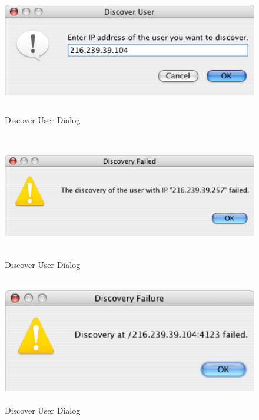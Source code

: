\documentclass[11pt,a4paper]{article}
\begin{document}
\begin{figure}[H]
\begin{center}
  \includegraphics[height=2.17in, width=5.96in]{../images/usermanual/ace_discover.eps}
\caption{Discover User Dialog}
\label{default}
\end{center}
\end{figure}

\begin{figure}[H]
\begin{center}
  \includegraphics[height=2.17in, width=6.67in]{../images/usermanual/discover_failed_inv_ip.eps}
\caption{Discover User Dialog}
\label{default}
\end{center}
\end{figure}

\begin{figure}[H]
\begin{center}
  \includegraphics[height=2.17in, width=5.36in]{../images/usermanual/discover_failed_no_ace.eps}
\caption{Discover User Dialog}
\label{default}
\end{center}
\end{figure}
\end{document}

